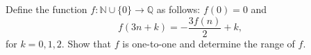 Define the function $f: \mathbb N \cup \{0\} \to \mathbb{Q}$ as follows: $f(0) = 0$ and \[ f(3n+k) = -\frac{3f(n)}{2} + k ,  \] for $k = 0, 1, 2$. Show that $f$ is one-to-one and determine the range of $f$.